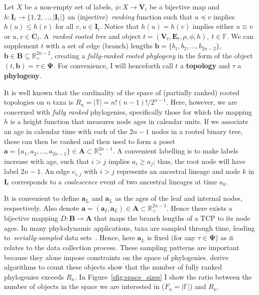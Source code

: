 Let $X$ be a non-empty set of labels, $\phi : X \to \boldsymbol V_t$ be a bijective map and $h : \boldsymbol I_t \to \{1, 2, \ldots, |\boldsymbol I_t|\}$ an (injective)~\textit{ranking} function such that $u \preceq v$ implies $h(u) \leq h(v)$ for all $v,u \in \boldsymbol I_t$. 
Notice that $h(u) = h(v)$ implies either $u \equiv v $ or $u, v \in \boldsymbol C_t$. 
A~\textit{ranked rooted tree} and object $t = (\boldsymbol V_t, \boldsymbol E_t, \rho, \phi, h),\: t \in \mathbb{F}$.
We can supplement $t$ with a set of edge (branch) lengths $\boldsymbol b = \{b_1, b_2, \ldots, b_{2n-2} \}$, $\boldsymbol b \in \boldsymbol B \subseteq \mathbb{R}_{+}^{2n-2}$, creating a \textit{fully-ranked rooted phylogeny} in the form of the object $(t, \boldsymbol b) = \tau \in \boldsymbol\Psi$.
For convenience, I will henceforth call $t$ a \textbf{topology} and $\tau$ a \textbf{phylogeny}.

It is well known that the cardinality of the space of (partially ranked) rooted topologies on $n$ taxa is $R_n = |\mathbb{T}| = n!(n-1)!/2^{n-1}$.
Here, however, we are concerned with \textit{fully ranked} phylogenies, specifically those for which the mapping $h$ is a height function that measures node ages in calendar units.
If we associate an age in calendar time with each of the $2n-1$ nodes in a rooted binary tree, these can then be ranked and then used to form a poset $\boldsymbol a = \{a_1, a_2, \ldots, a_{2n-1} \} \in \boldsymbol A \subset \mathbb{R}_+^{2n-1}$.
A convenient labelling is to make labels increase with age, such that $i > j$ implies $a_i \geq a_j$; thus, the root node will have label $2n-1$.
An edge $e_{i,j}$ with $i > j$ represents an ancestral lineage and node $k$ in $\boldsymbol I_t$ corresponds to a \textit{coalescence} event of two ancestral lineages at time $a_k$.

It is convenient to define $\boldsymbol a_L$ and $\boldsymbol a_L$ as the ages of the leaf and internal nodes, respectively.
Also denote $\boldsymbol a  = (\boldsymbol a_I , \boldsymbol a_L) \in \boldsymbol A \subset \mathbb{R}_+^{2n-1}$.
Hence there exists a bijective mapping $D : \boldsymbol B \rightarrow \boldsymbol A$ that maps the branch lengths of a TCP to its node ages.
In many phylodynamic applications, taxa are sampled through time, leading to~\textit{serially-sampled} data sets~\citep{Drummond2002}.
Hence, here $\boldsymbol a_L$ is fixed (for any $\tau \in  \boldsymbol \Psi$) as it relates to the data collection process. 
These sampling patterns are important because they alone impose constraints on the space of phylogenies.
\cite{Gavryushkina2013} derive algorithms to count these objects show that the number of fully ranked phylogenies exceeds $R_n$. 
In Figure~\ref{sfig:space_sizes} I show the ratio between the number of objects in the space we are interested in ($ F_n  = |\mathbb{F}|$) and $R_n$.

